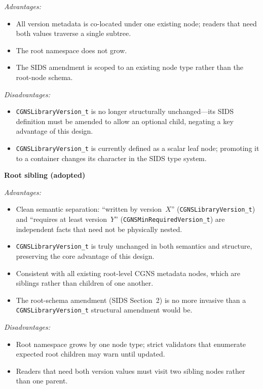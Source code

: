 \documentclass[11pt,letterpaper]{article}
\begin{document}
\textit{Advantages:}
\begin{itemize}[leftmargin=2em]
\item All version metadata is co-located under one existing node;
  readers that need both values traverse a single subtree.
\item The root namespace does not grow.
\item The SIDS amendment is scoped to an existing node type rather
  than the root-node schema.
\end{itemize}

\textit{Disadvantages:}
\begin{itemize}[leftmargin=2em]
\item \texttt{CGNSLibraryVersion\_t} is no longer structurally
  unchanged---its SIDS definition must be amended to allow an
  optional child, negating a key advantage of this design.
\item \texttt{CGNSLibraryVersion\_t} is currently defined as a
  scalar leaf node; promoting it to a container changes its
  character in the SIDS type system.
\end{itemize}

\textbf{Root sibling (adopted)}

\textit{Advantages:}
\begin{itemize}[leftmargin=2em]
\item Clean semantic separation: ``written by version~$X$''
  (\texttt{CGNSLibraryVersion\_t}) and ``requires at least
  version~$Y$'' (\texttt{CGNSMinRequiredVersion\_t}) are independent
  facts that need not be physically nested.
\item \texttt{CGNSLibraryVersion\_t} is truly unchanged in both
  semantics and structure, preserving the core advantage of this design.
\item Consistent with all existing root-level CGNS metadata nodes,
  which are siblings rather than children of one another.
\item The root-schema amendment (SIDS Section~2) is no more invasive
  than a \texttt{CGNSLibraryVersion\_t} structural amendment would be.
\end{itemize}

\textit{Disadvantages:}
\begin{itemize}[leftmargin=2em]
\item Root namespace grows by one node type; strict validators that
  enumerate expected root children may warn until updated.
\item Readers that need both version values must visit two sibling
  nodes rather than one parent.
\end{itemize}
\end{document}
